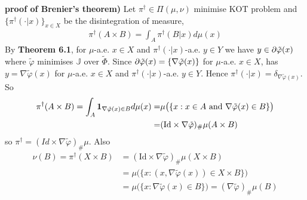\documentclass[12pt,a4paper]{article}
\newenvironment{proof}
{\begin{changemargin}{1cm}{0.5cm} 
	}%
	{\end{changemargin}
}
\newenvironment{p}
{\begin{proof} 
	}%
	{\end{proof}
}
\begin{document}
\begin{p}
\textbf{proof of Brenier's theorem)} Let $\pi^{\dagger} \in \Pi(\mu, \nu)$ minimise KOT problem and $\{\pi^{\dagger}(\cdot |x) \}_{x\in X}$ be the disintegration of measure,
\begin{align*}
\pi^{\dagger}(A\times B) = \int_A \pi^{\dagger}(B|x) d\mu(x)
\end{align*}
By \textbf{Theorem 6.1}, for $\mu$-a.e. $x\in X$ and $\pi^{\dagger}(\cdot |x) $-a.e. $y\in Y$ we have $y\in \partial \tilde{\varphi}(x)$ where $\tilde{\varphi}$ minimises $\mathbb{J}$ over $\tilde{\Phi}$. Since $\partial \tilde{\varphi}(x) = \{\nabla \tilde{\varphi}(x)\}$ for $\mu$-a.e. $x\in X$, has $y = \nabla \tilde{\varphi}(x)$ for $\mu$-a.e. $x\in X$ and $\pi^{\dagger}(\cdot|x)$-a.e. $y\in Y$. Hence $\pi^{\dagger}(\cdot | x) = \delta_{\nabla \tilde{\varphi}(x)}$. So
\begin{align*}
\pi^{\dagger}(A\times B) = \int_A  \bm{1}_{\nabla \tilde{\varphi}(x) \in B} d\mu(x) =& \mu \big( \{ x: x\in A \text{ and } \nabla \tilde{\varphi}(x) \in B \}\big) \\
= & ( \text{Id} \times \nabla \tilde{\varphi})_{\#} \mu(A \times B)
\end{align*}
so $\pi^{\dagger} = (Id \times \nabla \tilde{\varphi})_{\#} \mu$. Also
\begin{align*}
\nu(B) = \pi^{\dagger}(X\times B) &= ( \text{Id} \times \nabla \tilde{\varphi})_{\#} \mu(X\times B) \\
&= \mu \big( \{x: (x, \nabla \tilde{\varphi}(x)) \in X\times B  \}\big) \\
&= \mu \big(\{ x: \nabla \tilde{\varphi}(x) \in B \}\big) = (\nabla \tilde{\varphi})_{\#} \mu(B)
\end{align*}


\end{p}
\end{document}
